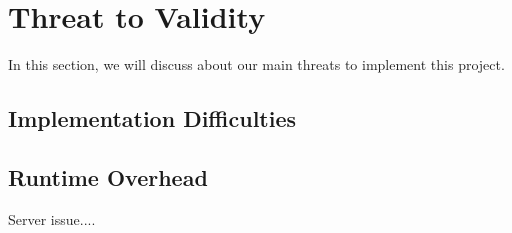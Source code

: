 \section{Threat to Validity}
\label{lbl:threat}
In this section, we will discuss about our main threats to implement this project. 

\subsection{Implementation Difficulties}

\subsection{Runtime Overhead}

Server issue....

